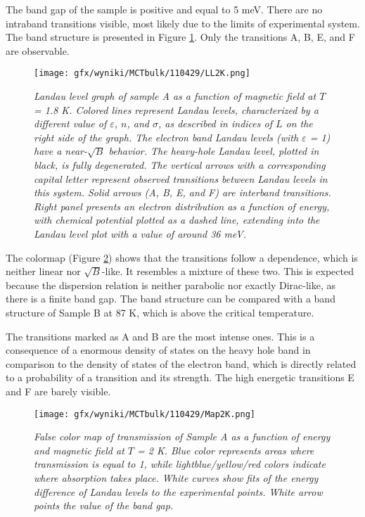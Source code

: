 \documentclass[titlepage,a4paper]{book}
\begin{document}
The band gap of the sample is positive and equal to 5 meV. There are no intraband transitions visible, most likely due to the limits of experimental system. The band structure is presented in Figure \ref{fig:LL_110429_2K}. Only the transitions A, B, E, and F are observable.

\begin{figure}[ht]
	\centering
	\texttt{[image: gfx/wyniki/MCTbulk/110429/LL2K.png]}
	\vspace{-10pt}
	\caption{\textit{Landau level graph of sample A as a function of magnetic field at $T$ = 1.8 K. Colored lines represent Landau levels, characterized by a different value of $\varepsilon$, $n$, and $\sigma$, as described in indices of $L$ on the right side of the graph. The electron band Landau levels (with $\varepsilon$ = 1) have a near-$\sqrt{B}$ behavior. The heavy-hole Landau level, plotted in black, is fully degenerated. The vertical arrows with a corresponding capital letter represent observed transitions between Landau levels in this system. Solid arrows (A, B, E, and F) are interband transitions. Right panel presents an electron distribution as a function of energy, with chemical potential plotted as a dashed line, extending into the Landau level plot with a value of around 36 meV.}}
	\label{fig:LL_110429_2K}
\end{figure}
The colormap (Figure \ref{fig:Map_110429_2K}) shows that the transitions follow a dependence, which is neither linear nor  $\sqrt{B}$-like. It resembles a mixture of these two. This is expected because the dispersion relation is neither parabolic nor exactly Dirac-like, as there is a finite band gap. The band structure can be compared with a band structure of Sample B at 87 K, which is above the critical temperature. 

The transitions marked as A and B are the most intense ones. This is a consequence of a enormous density of states on the heavy hole band in comparison to the density of states of the electron band, which is directly related to a probability of a transition and its strength. The high energetic transitions E and F are barely visible.

\begin{figure}[ht]
	\centering
	\texttt{[image: gfx/wyniki/MCTbulk/110429/Map2K.png]}
	\vspace{-10pt}
	\caption{\textit{False color map of transmission of Sample A as a function of energy and magnetic field at $T$ = 2 K. Blue color represents areas where transmission is equal to 1, while lightblue/yellow/red colors indicate where absorption takes place. White curves show fits of the energy difference of Landau levels to the experimental points. White arrow points the value of the band gap.}}
	\label{fig:Map_110429_2K}
\end{figure} 
\end{document}
